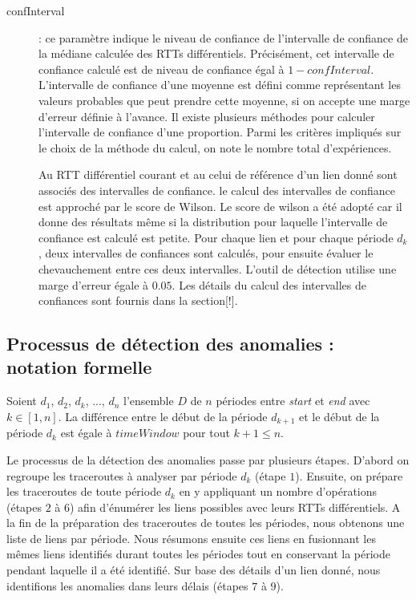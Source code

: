 \begin{description}
	
	\item[confInterval] : ce paramètre indique le niveau de confiance de l'intervalle de confiance de la médiane calculée des RTTs différentiels. Précisément, cet intervalle de confiance calculé est de niveau de confiance égal à $ 1 - confInterval $.  L'intervalle de confiance d'une moyenne  est défini comme représentant les valeurs probables que peut prendre cette moyenne, si on accepte une marge d'erreur définie à l'avance. Il existe plusieurs méthodes pour calculer l'intervalle de confiance d'une proportion. Parmi les critères impliqués sur le choix de la méthode du calcul, on note le nombre total d'expériences.
	
	Au RTT différentiel courant et  au celui de référence d'un lien donné sont associés des intervalles de confiance.  le calcul des intervalles de confiance  est approché par le score de Wilson. Le score de wilson a été adopté car il donne des résultats même si la distribution pour laquelle l'intervalle de confiance est calculé est petite. Pour chaque lien et pour chaque période $d_k$,  deux intervalles de confiances sont calculés, pour ensuite évaluer le chevauchement entre ces deux intervalles. L'outil de détection utilise une marge d'erreur égale à  $ 0.05 $. Les détails du calcul des intervalles de confiances sont fournis dans la section[!].
\end{description}


\subsection{Processus de  détection des anomalies  : notation formelle}\label{steps-rtt-analysis}

Soient $ d_1 $, $  d_2 $, $d_k$, ..., $ d_n $ l'ensemble $D$ de $n$ périodes entre \textit{start} et \textit{end} avec $k \in [1,n]$. La différence entre le début de la période $ d_{k+1} $ et le début de la période $ d_k $ est égale à $timeWindow$ pour tout $k+1 \leq n $.  

Le processus de la détection des anomalies passe par plusieurs étapes. D'abord on  regroupe les traceroutes à analyser par période $d_k$ (étape $ 1 $). Ensuite, on prépare les traceroutes de toute  période $d_k$ en y appliquant un nombre d'opérations (étapes  $ 2 $ à $ 6 $) afin d'énumérer les liens possibles avec leurs RTTs différentiels. A la fin de la préparation des traceroutes de toutes les périodes, nous obtenons une liste de liens par période. Nous résumons ensuite ces liens en fusionnant les mêmes liens identifiés durant toutes les périodes tout en conservant la période pendant laquelle il a été identifié. Sur base des détails d'un lien donné,  nous identifions les anomalies dans leurs délais (étapes $ 7 $ à $9$). 

